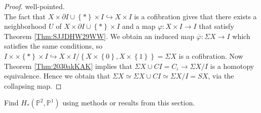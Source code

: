 \begin{proof}
well-pointed.\\
\linebreak
The fact that
$X \times \partial I \cup \left\{ * \right\} \times I
\hookrightarrow X \times I$ is a cofibration
gives that there exists a neighborhood $U$ of
$X \times \partial I \cup 
\left\{ * \right\} \times I$ and a map
$\varphi \colon X \times I \to I$ 
that satisfy Theorem \ref{Thm:SJJDHW29WW}.
We obtain an induced map
$\overline{\varphi }\colon
\Sigma X \to I$ 
which satisfies the same conditions, so
$I \times \times \left\{ * \right\} \times I
\hookrightarrow X \times I / 
\left\{ X \times \left\{ 0 \right\} ,
X \times \left\{ 1 \right\} \right\} = \Sigma X$ is a
cofibration. Now 
Theorem \ref{Thm:2030akKAK} implies
that $\Sigma X \cup CI = C_{\iota} \to \Sigma X / I$ is a homotopy
equivalence.
Hence we obtain
that 
$\Sigma X \simeq
\Sigma X \cup CI \simeq
\Sigma X / I = SX$, via the collapsing map.

\end{proof}


\begin{problem}[]
    Find $H_* \left( \mathbb{P}^2, \mathbb{P}^{1} \right) $ 
    using methods or results from this section.
\end{problem}

